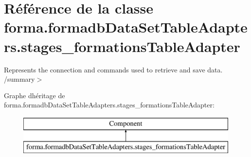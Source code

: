 \hypertarget{classforma_1_1formadb_data_set_table_adapters_1_1stages__formations_table_adapter}{}\section{Référence de la classe forma.\+formadb\+Data\+Set\+Table\+Adapters.\+stages\+\_\+formations\+Table\+Adapter}
\label{classforma_1_1formadb_data_set_table_adapters_1_1stages__formations_table_adapter}


Represents the connection and commands used to retrieve and save data. /summary$>$  


Graphe d\textquotesingle{}héritage de forma.\+formadb\+Data\+Set\+Table\+Adapters.\+stages\+\_\+formations\+Table\+Adapter\+:\begin{figure}[H]
\begin{center}
\leavevmode
\includegraphics[height=2.000000cm]{classforma_1_1formadb_data_set_table_adapters_1_1stages__formations_table_adapter}
\end{center}
\end{figure}
